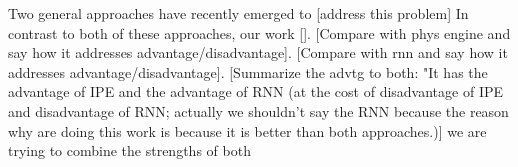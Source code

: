 

Two general approaches have recently emerged to [address this problem] %
In contrast to both of these approaches, our work []. [Compare with phys engine and say how it addresses advantage/disadvantage]. [Compare with rnn and say how it addresses advantage/disadvantage]. [Summarize the advtg to both: "It has the advantage of IPE and the advantage of RNN (at the cost of disadvantage of IPE and disadvantage of RNN; actually we shouldn't say the RNN because the reason why are doing this work is because it is better than both approaches.)] we are trying to combine the strengths of both


% 


